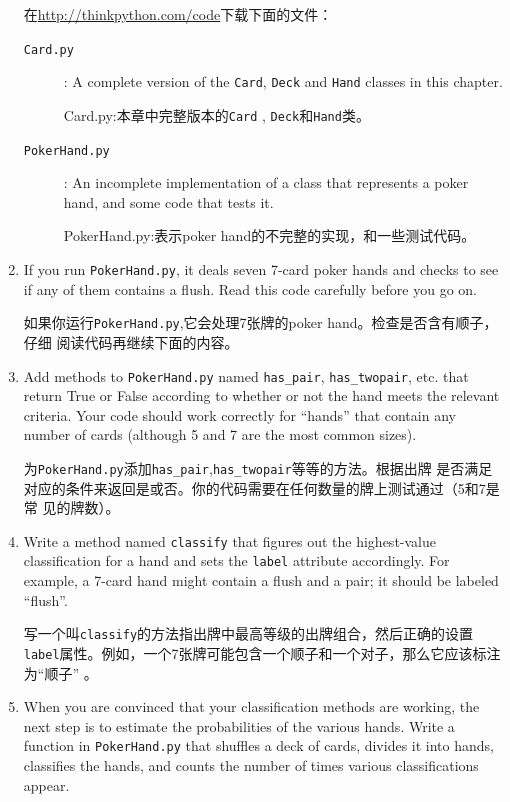 \documentclass[10pt]{book}
\begin{document}
\begin{CJK}{UTF8}{gbsn}
\begin{exercise}
\begin{enumerate}
    在\url{http://thinkpython.com/code}下载下面的文件：

\begin{description}

\item[{\tt Card.py}]: A complete version of the {\tt Card},
{\tt Deck} and {\tt Hand} classes in this chapter.

Card.py:本章中完整版本的{\tt Card} , {\tt Deck}和{\tt Hand}类。

\item[{\tt PokerHand.py}]: An incomplete implementation of a class
that represents a poker hand, and some code that tests it.

PokerHand.py:表示poker hand的不完整的实现，和一些测试代码。

\end{description}
%
\item If you run {\tt PokerHand.py}, it deals seven 7-card poker hands
and checks to see if any of them contains a flush.  Read this
code carefully before you go on.

如果你运行{\tt PokerHand.py},它会处理7张牌的poker hand。检查是否含有顺子，仔细
阅读代码再继续下面的内容。

\item Add methods to {\tt PokerHand.py} named \verb"has_pair",
\verb"has_twopair", etc. that return True or False according to
whether or not the hand meets the relevant criteria.  Your code should
work correctly for ``hands'' that contain any number of cards
(although 5 and 7 are the most common sizes).

为{\tt PokerHand.py}添加\verb"has_pair",\verb"has_twopair"等等的方法。根据出牌
是否满足对应的条件来返回是或否。你的代码需要在任何数量的牌上测试通过（5和7是常
见的牌数）。

\item Write a method named {\tt classify} that figures out
the highest-value classification for a hand and sets the
{\tt label} attribute accordingly.  For example, a 7-card hand
might contain a flush and a pair; it should be labeled ``flush''.

写一个叫{\tt classify}的方法指出牌中最高等级的出牌组合，然后正确的设置{\tt
label}属性。例如，一个7张牌可能包含一个顺子和一个对子，那么它应该标注为``顺子''
。

\item When you are convinced that your classification methods are
working, the next step is to estimate the probabilities of the various
hands.  Write a function in {\tt PokerHand.py} that shuffles a deck of
cards, divides it into hands, classifies the hands, and counts the
number of times various classifications appear.


\end{enumerate}
\end{exercise}
\end{CJK}
\end{document}
